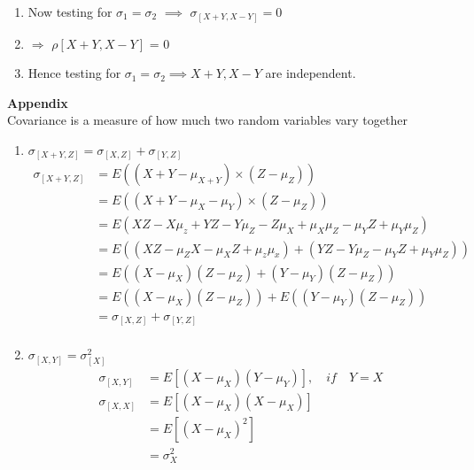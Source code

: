 \documentclass{article}
\begin{document}
\begin{enumerate}
\begin{enumerate}
\item Now testing for $\sigma_1 = \sigma_2 $ $\implies$ $\sigma_{[X+Y,X-Y]}= 0$
\item $\Rightarrow$ $\rho[X+Y,X-Y]$ =  0
\item Hence testing for   $\sigma_1 = \sigma_2 \implies X+Y, X-Y$ are independent.
\end{enumerate}
\end{enumerate}

\large \textbf{Appendix}\\
Covariance is a measure of how much two random variables vary together
\begin{enumerate}
    \item \large $\sigma_{[X+Y,Z]} = \sigma_{[X,Z]} + \sigma_{[Y,Z]}$
    \begin{align*}
        \sigma_{[X+Y,Z]} &= E((X+Y - \mu_{X+Y}) \times (Z -\mu_{Z} ))\\
        &= E((X+Y - \mu_{X}-\mu_{Y}) \times (Z -\mu_{Z} ))\\
        &= E(XZ-X\mu_z+YZ-Y\mu_Z-Z\mu_X+\mu_X\mu_Z-\mu_YZ+\mu_Y\mu_Z)\\
        &= E((XZ-\mu_ZX-\mu_XZ+\mu_z\mu_x) + (YZ-Y\mu_Z-\mu_YZ+\mu_Y\mu_Z))\\
        &= E((X-\mu_X)(Z-\mu_Z)+ (Y-\mu_Y)(Z-\mu_Z))\\
        &= E((X-\mu_X)(Z-\mu_Z)) + E((Y-\mu_Y)(Z-\mu_Z))\\
        &=\sigma_{[X,Z]} + \sigma_{[Y,Z]}\\
    \end{align*}
    
    \item \large  $ \sigma_{[X,Y]}= \sigma_{[X]}^2$\\
    \begin{align*}
        \sigma_{[X,Y]} &= E[(X-\mu_X) (Y-\mu_Y)],
        \quad \textit{if}\quad Y=X \\
        \sigma_{[X,X]} &= E[(X-\mu_X) (X-\mu_X)]\\
        &=E[(X-\mu_X)^2]\\
        &=\sigma_X^2
    \end{align*}
    

\end{enumerate}
\end{document}
